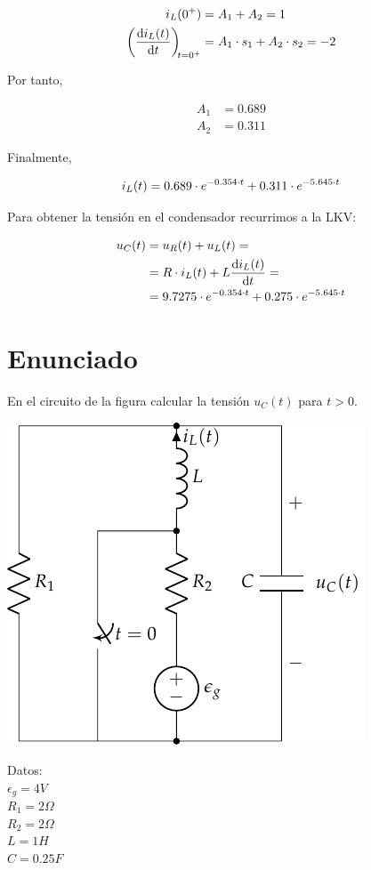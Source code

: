\begin{align*}
  i_L(0^+) &= A_1 + A_2 = 1\\
  \diff{i_L(t)}{t}[t = 0^+] &= A_1 \cdot s_1 + A_2 \cdot s_2 = -2
\end{align*}

Por tanto,

\begin{align*}
  A_1 &= 0.689\\
  A_2 &= 0.311
\end{align*}

Finalmente,

\begin{equation*}
  i_L(t) = 0.689 \cdot e^{-0.354 \cdot t} + 0.311 \cdot e^{-5.645 \cdot t}\\
\end{equation*}

Para obtener la tensión en el condensador recurrimos a la LKV:

\begin{align*}
  u_C(t) &= u_R(t) + u_L(t) = \\
         &= R \cdot i_L(t) + L \diff{i_L(t)}{t} = \\
         &= 9.7275 \cdot e^{-0.354 \cdot t} + 0.275 \cdot e^{-5.645 \cdot t}
\end{align*}

\section{Enunciado}
En el circuito de la figura calcular la tensión $u_C(t)$ para $t > 0$.

\begin{minipage}{0.5\linewidth}
  \begin{center}
    \includegraphics{figuras/FM_4_9.pdf}
  \end{center}
\end{minipage}
\begin{minipage}{0.5\linewidth}
  Datos:\\
  $\epsilon_g = 4V$\\
  $R_1 = {2}{\Omega}$\\
  $R_2 = {2}{\Omega}$\\
  $L = {1}{H}$\\
  $C = {0.25}{F}$
\end{minipage}

